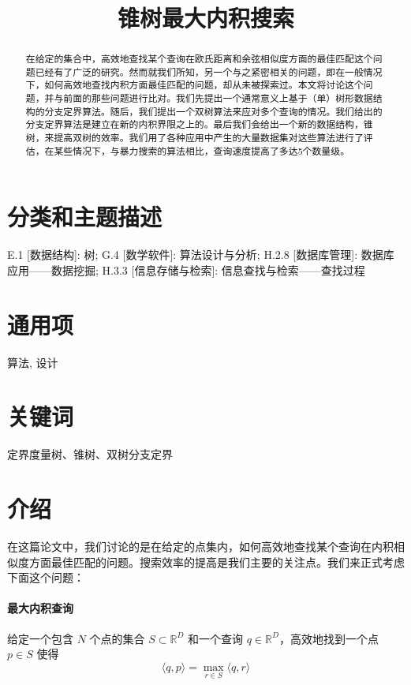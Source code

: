 \documentclass[twocolumn]{article}
\begin{document}
\title{锥树最大内积搜索}
\maketitle

\begin{abstract}
在给定的集合中，高效地查找某个查询在欧氏距离和余弦相似度方面的最佳匹配这个问题已经有了广泛的研究。然而就我们所知，另一个与之紧密相关的问题，即在一般情况下，如何高效地查找内积方面最佳匹配的问题，却从未被探索过。本文将讨论这个问题，并与前面的那些问题进行比对。我们先提出一个通常意义上基于（单）树形数据结构的分支定界算法。随后，我们提出一个双树算法来应对多个查询的情况。我们给出的分支定界算法是建立在新的内积界限之上的。最后我们会给出一个新的数据结构，锥树，来提高双树的效率。我们用了各种应用中产生的大量数据集对这些算法进行了评估，在某些情况下，与暴力搜索的算法相比，查询速度提高了多达5个数量级。
\end{abstract}

\section*{分类和主题描述}
E.1 [数据结构]: 树; G.4 [数学软件]: 算法设计与分析; H.2.8 [数据库管理]: 数据库应用——数据挖掘; H.3.3 [信息存储与检索]: 信息查找与检索——查找过程
\section*{通用项}
算法, 设计
\section*{关键词}
定界度量树、锥树、双树分支定界

\section{介绍}
在这篇论文中，我们讨论的是在给定的点集内，如何高效地查找某个查询在内积相似度方面最佳匹配的问题。搜索效率的提高是我们主要的关注点。我们来正式考虑下面这个问题：

\paragraph{最大内积查询} 给定一个包含 $N$ 个点的集合 $S \subset \mathbb{R}^D$ 和一个查询 $q \in \mathbb{R}^D$，高效地找到一个点 $p \in S$ 使得
\begin{equation}
\langle q,p \rangle = \max_{r \in S}\langle q,r \rangle
\end{equation}
\end{document}
